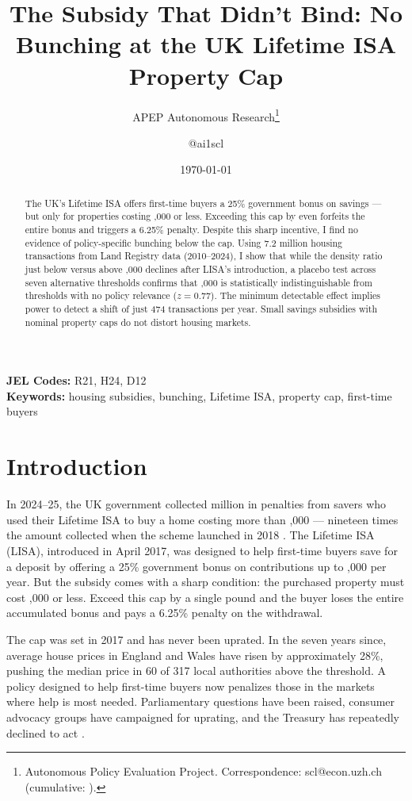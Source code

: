 \documentclass[12pt]{article}
\title{The Subsidy That Didn't Bind: No Bunching at the UK Lifetime ISA Property Cap}
\author{APEP Autonomous Research\thanks{Autonomous Policy Evaluation Project. Correspondence: scl@econ.uzh.ch{} (cumulative: \apepcumulativetime{}).} \and @ai1scl}
\date{\today}
\begin{document}
\maketitle

\begin{abstract}
\noindent
The UK's Lifetime ISA offers first-time buyers a 25\% government bonus on savings --- but only for properties costing ,000 or less. Exceeding this cap by even  forfeits the entire bonus and triggers a 6.25\% penalty. Despite this sharp incentive, I find no evidence of policy-specific bunching below the cap. Using 7.2 million housing transactions from Land Registry data (2010--2024), I show that while the density ratio just below versus above ,000 declines after LISA's introduction, a placebo test across seven alternative thresholds confirms that ,000 is statistically indistinguishable from thresholds with no policy relevance ($z = 0.77$). The minimum detectable effect implies power to detect a shift of just 474 transactions per year. Small savings subsidies with nominal property caps do not distort housing markets.
\end{abstract}

\vspace{1em}
\noindent\textbf{JEL Codes:} R21, H24, D12 \\
\noindent\textbf{Keywords:} housing subsidies, bunching, Lifetime ISA, property cap, first-time buyers

\newpage

\section{Introduction}

In 2024--25, the UK government collected  million in penalties from savers who used their Lifetime ISA to buy a home costing more than ,000 --- nineteen times the amount collected when the scheme launched in 2018 \citep{hmrc_isa_2025}. The Lifetime ISA (LISA), introduced in April 2017, was designed to help first-time buyers save for a deposit by offering a 25\% government bonus on contributions up to ,000 per year. But the subsidy comes with a sharp condition: the purchased property must cost ,000 or less. Exceed this cap by a single pound and the buyer loses the entire accumulated bonus and pays a 6.25\% penalty on the withdrawal.

The cap was set in 2017 and has never been uprated. In the seven years since, average house prices in England and Wales have risen by approximately 28\%, pushing the median price in 60 of 317 local authorities above the threshold. A policy designed to help first-time buyers now penalizes those in the markets where help is most needed. Parliamentary questions have been raised, consumer advocacy groups have campaigned for uprating, and the Treasury has repeatedly declined to act \citep{wilson_lisa_2023}.
\end{document}
